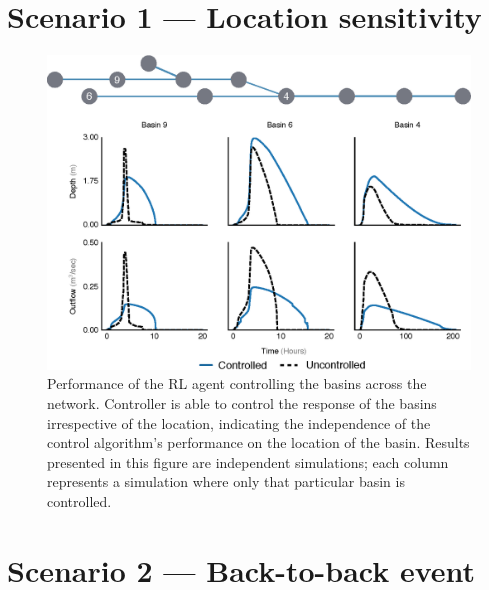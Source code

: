 \section{Scenario 1 --- Location sensitivity}\label{SI:reward-loc}
\begin{figure}[H]
    \centering
    \includegraphics[width=\linewidth]{gfx/Chapter-3/location_senstiv.eps}
    \caption{Performance of the RL agent controlling the basins across the network. Controller is able to control the response of the basins irrespective of the location, indicating the independence of the control algorithm's performance on the location of the basin. Results presented in this figure are independent simulations; each column represents a simulation where only that particular basin is controlled.}\label{fig:9}
\end{figure}

\section{Scenario 2 --- Back-to-back event}\label{SI:b2b-events}

